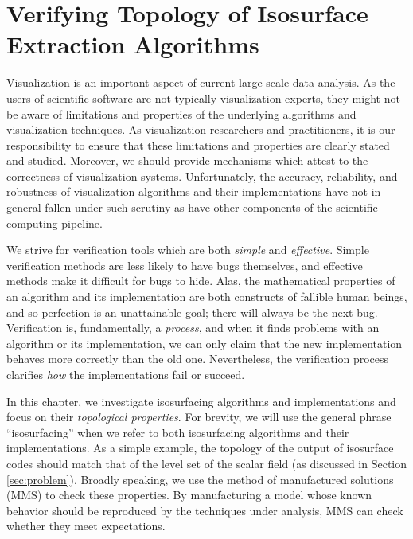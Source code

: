 \chapter{Verifying Topology of Isosurface Extraction Algorithms}\label{chap:topology}

Visualization is an important aspect of current large-scale
data analysis.
%
As the users of scientific software are not typically visualization
experts,
%
they might not be aware of limitations
and properties of the underlying algorithms and visualization
techniques.
%
As visualization researchers and practitioners, it is our responsibility to
ensure that these limitations and properties are clearly stated and studied.
%
Moreover, we should provide mechanisms which attest to the correctness of 
visualization systems.
%
Unfortunately, the accuracy, reliability, and robustness of visualization
algorithms and their implementations have not in general fallen under
such scrutiny as have other components of the scientific computing
pipeline.
%


We strive for verification tools which are both \emph{simple} and
\emph{effective}. Simple verification methods are less likely to have
bugs themselves, and effective methods make it difficult for bugs to
hide.  Alas, the mathematical properties of an algorithm and its
implementation are both constructs of fallible human beings, and so
perfection is an unattainable goal; there will always be the next
bug. Verification is, fundamentally, a \emph{process}, and when it
finds problems with an algorithm or its implementation, we can only
claim that the new implementation behaves more correctly than the old
one.  Nevertheless, the verification process clarifies \emph{how} the
implementations fail or succeed.

In this chapter, we investigate isosurfacing algorithms and
implementations and focus on their \emph{topological properties}. For
brevity, we will use the general phrase ``isosurfacing'' when we refer
to both isosurfacing algorithms and their implementations.
%
As a simple example, the topology of the output of isosurface codes
should match that of the level set of the scalar field (as discussed
in Section \ref{sec:problem}).
%
Broadly speaking, we use the method of manufactured solutions (MMS) to
check these properties.
%
By manufacturing a model whose known behavior should be reproduced by
the techniques under analysis, MMS can check whether they meet
expectations.


